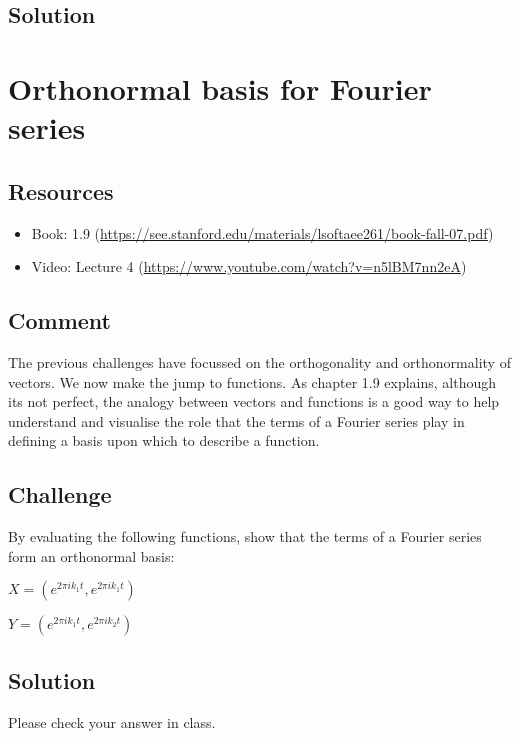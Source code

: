 \subsection*{Solution}




\newpage
\section{Orthonormal basis for Fourier series}

\subsection*{Resources}
\begin{itemize}
    \item Book: 1.9 (\url{https://see.stanford.edu/materials/lsoftaee261/book-fall-07.pdf})
    \item Video: Lecture 4 (\url{https://www.youtube.com/watch?v=n5lBM7nn2eA})
\end{itemize}

\subsection*{Comment}
The previous challenges have focussed on the orthogonality and orthonormality of vectors. We now make the jump to functions. As chapter 1.9 explains, although its not perfect, the analogy between vectors and functions is a good way to help understand and visualise the role that the terms of a Fourier series play in defining a basis upon which to describe a function.

\subsection*{Challenge}
By evaluating the following functions, show that the terms of a Fourier series form an orthonormal basis:

$X = (e^{2 \pi i k_1 t}, e^{2 \pi i k_1 t})$

$Y = (e^{2 \pi i k_1 t}, e^{2 \pi i k_2 t})$

\subsection*{Solution}
Please check your answer in class.




\newpage
